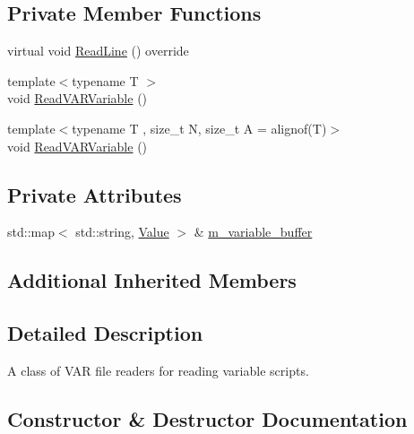 \subsection*{Private Member Functions}
\begin{DoxyCompactItemize}
\item 
virtual void \mbox{\hyperlink{classmage_1_1loader_1_1_v_a_r_reader_af9a470c013179401016300ef85df6b3a}{Read\+Line}} () override
\item 
{\footnotesize template$<$typename T $>$ }\\void \mbox{\hyperlink{classmage_1_1loader_1_1_v_a_r_reader_a253cd885c8527453feedfe619fb684e1}{Read\+V\+A\+R\+Variable}} ()
\item 
{\footnotesize template$<$typename T , size\+\_\+t N, size\+\_\+t A = alignof(\+T)$>$ }\\void \mbox{\hyperlink{classmage_1_1loader_1_1_v_a_r_reader_aa27db2b3ba9c66dbdd2c75c6aba1848c}{Read\+V\+A\+R\+Variable}} ()
\end{DoxyCompactItemize}
\subsection*{Private Attributes}
\begin{DoxyCompactItemize}
\item 
std\+::map$<$ std\+::string, \mbox{\hyperlink{namespacemage_a68ae02d3a746ed2f285aa2b10f131a21}{Value}} $>$ \& \mbox{\hyperlink{classmage_1_1loader_1_1_v_a_r_reader_a4553e25a88b1274de12ebc6d078463b5}{m\+\_\+variable\+\_\+buffer}}
\end{DoxyCompactItemize}
\subsection*{Additional Inherited Members}


\subsection{Detailed Description}
A class of V\+AR file readers for reading variable scripts. 

\subsection{Constructor \& Destructor Documentation}
\mbox{\label{classmage_1_1loader_1_1_v_a_r_reader_a1bc1c64c05bac406be792d9d51739379}} 
